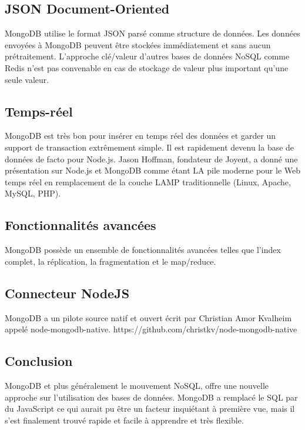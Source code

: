 \subsection{JSON Document-Oriented}

MongoDB utilise le format JSON parsé comme structure de données. Les données envoyées à MongoDB peuvent être stockées immédiatement et sans aucun prétraitement. L’approche clé/valeur d’autres bases de données NoSQL comme Redis n’est pas convenable en cas de stockage de valeur plus important qu’une seule valeur.

\subsection{Temps-réel}

MongoDB est très bon pour insérer en temps réel des données et garder un support de transaction extrêmement simple.
Il est rapidement devenu la base de données de facto pour Node.js. Jason Hoffman, fondateur de Joyent, a donné une présentation sur Node.js et MongoDB comme étant LA pile moderne pour le Web temps réel en remplacement de la couche LAMP traditionnelle (Linux, Apache, MySQL, PHP).

\subsection{Fonctionnalités avancées}

MongoDB possède un ensemble de fonctionnalités avancées telles que l’index complet, la réplication, la fragmentation et le map/reduce.

\subsection{Connecteur NodeJS}

MongoDB a un pilote source natif et ouvert écrit par Christian Amor Kvalheim appelé node-mongodb-native.
https://github.com/christkv/node-mongodb-native

\subsection{Conclusion}

MongoDB et plus généralement le mouvement NoSQL, offre une nouvelle approche sur l’utilisation des bases de données. MongoDB a remplacé le SQL par du JavaScript ce qui aurait pu être un facteur inquiétant à première vue, mais il s'est finalement trouvé rapide et facile à apprendre et très flexible.


